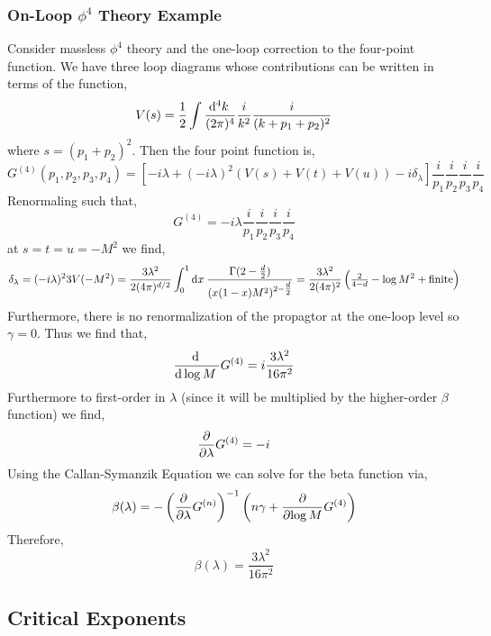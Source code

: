 \documentclass[12pt]{extarticle}
\begin{document}
\subsubsection{On-Loop $\phi^4$ Theory Example}

Consider massless $\phi^4$ theory and the one-loop correction to the four-point function. We have three loop diagrams whose contributions can be written in terms of the function,
\[ V(s) = \frac{1}{2} \int \frac{\mathrm{d}^{4} k \:}{(2 \pi)^4} \frac{i}{k^2} \frac{i}{(k + p_1 + p_2)^2}  \]
where $s = (p_1 + p_2)^2$. Then the four point function is,
\[ G^{(4)}(p_1, p_2, p_3, p_4) = \left[ - i \lambda + (- i \lambda)^2 \left( V(s) + V(t) + V(u) \right) - i \delta_{\lambda} \right] \frac{i}{p_1} \frac{i}{p_2} \frac{i}{p_3} \frac{i}{p_4} \] 
Renormaling such that,
\[ G^{(4)} = -i \lambda \frac{i}{p_1} \frac{i}{p_2} \frac{i}{p_3} \frac{i}{p_4} \]
at $s = t = u = - M^2$ we find,
\[ \delta_{\lambda} = (-i \lambda)^2 3 V(-M^2) = \frac{3 \lambda^2}{2 (4 \pi)^{d/2}} \int_0^1 \mathrm{d}x \: \frac{\Gamma(2 - \tfrac{d}{2})}{(x ( 1 - x) M^2)^{2 - \tfrac{d}{2}}} = \frac{3 \lambda^2}{2 (4 \pi)^2} \left( \tfrac{2}{4 - d} - \log{M^2} + \text{finite} \right) \] 
Furthermore, there is no renormalization of the propagtor at the one-loop level so $\gamma = 0$. Thus we find that,
\[ \frac{\mathrm{d} \:}{\mathrm{d}\log{M} \:} G^{(4)} = i \frac{3 \lambda^2}{16 \pi^2} \]
Furthermore to first-order in $\lambda$ (since it will be multiplied by the higher-order $\beta$ function) we find,
\[ \frac{\partial{}}{\partial{\lambda}} G^{(4)} = - i \]
Using the Callan-Symanzik Equation we can solve for the beta function via,
\[ \beta(\lambda) = - \left( \frac{\partial{}}{\partial{\lambda}} G^{(n)} \right)^{-1} \left( n \gamma + \frac{\partial{}}{\partial{\log{M}}} G^{(4)} \right) \]
Therefore,
\[ \beta(\lambda) = \frac{3 \lambda^2}{16 \pi^2} \]

\subsection{Critical Exponents}
\end{document}
